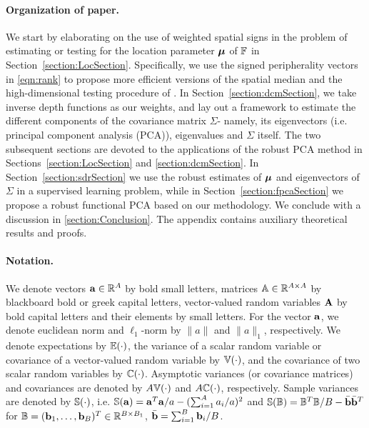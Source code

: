 \paragraph{Organization of paper.} We start by elaborating on the use of weighted spatial signs in the problem of estimating or testing for the location parameter ${\boldsymbol{\mu}}$ of ${\mathbb{F}}$ in Section~\ref{section:LocSection}. Specifically, we use the signed peripherality vectors in \eqref{eqn:rank} to propose more efficient versions of the spatial median \citep{brown83, Chaudhuri96} and the high-dimensional testing procedure of \cite{WangPengLi15}. In Section~\ref{section:dcmSection}, we take inverse depth functions \citep{MajumdarChatterjeeStat} as our weights, and lay out a framework to estimate the different components of the covariance matrix $\Sigma$- namely, its eigenvectors (i.e. principal component analysis (PCA)), eigenvalues and $\Sigma$ itself. The two subsequent sections are devoted to the applications of the robust PCA method in Sections~\ref{section:LocSection} and \ref{section:dcmSection}. In Section~\ref{section:sdrSection} we use the robust estimates of ${\boldsymbol{\mu}}$ and eigenvectors of $\Sigma$ in a supervised learning problem, while in Section~\ref{section:fpcaSection} we propose a robust functional PCA based on our methodology. We conclude with a discussion in \ref{section:Conclusion}. The appendix contains auxiliary theoretical results and proofs.

\paragraph{Notation.} We denote vectors ${\bf{a}} \in {\mathbb{R}}^A$ by bold small letters, matrices ${\mathbb{A}} \in {\mathbb{R}}^{A \times A}$ by blackboard bold or greek capital letters, vector-valued random variables ${\mathbf{A}}$ by bold capital letters and their elements by small letters. For the vector ${\bf{a}}$, we denote euclidean norm and $\ell_1$-norm by $\|a\|$ and $\| a\|_1$, respectively. We denote expectations by ${\mathbb{E}}(\cdot)$, the variance of a scalar random variable or covariance of a vector-valued random variable by ${\mathbb{V}}(\cdot)$, and the covariance of two scalar random variables by ${\mathbb{C}}(\cdot)$. Asymptotic variances (or covariance matrices) and covariances are denoted by $A{\mathbb{V}}(\cdot)$ and $A{\mathbb{C}}(\cdot)$, respectively. Sample variances are denoted by ${\mathbb{S}}(\cdot)$, i.e. ${\mathbb{S}}({\bf{a}}) = {\bf{a}}^T {\bf{a}} /a - (\sum_{i=1}^A a_i/a)^2$ and ${\mathbb{S}}({\mathbb{B}}) = {\mathbb{B}}^T {\mathbb{B}}/B - \bar {{\bf{b}}} \bar {{\bf{b}}}^T$ for ${\mathbb{B}} = ({\bf{b}}_1, \ldots, {\bf{b}}_B)^T \in {\mathbb{R}}^{B \times B_1}$, $\bar {{\bf{b}}} = \sum_{i=1}^B {\bf{b}}_i/B$.